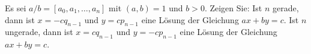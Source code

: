 
\begin{exercise}

Es sei $a/b = [a_0,a_1,\dots,a_n]$ mit $(a,b) = 1$ und $b > 0$.
Zeigen Sie: Ist $n$ gerade, dann ist $x = - cq_{n-1}$ und $y = cp_{n-1}$
eine Lösung der Gleichung $ax + by = c$. Ist $n$ ungerade, dann ist
$x = cq_{n-1}$ und $y = -cp_{n-1}$ eine Lösung der Gleichung $ax + by = c$.

\end{exercise}


\begin{solution}

\phantom{}

\end{solution}

